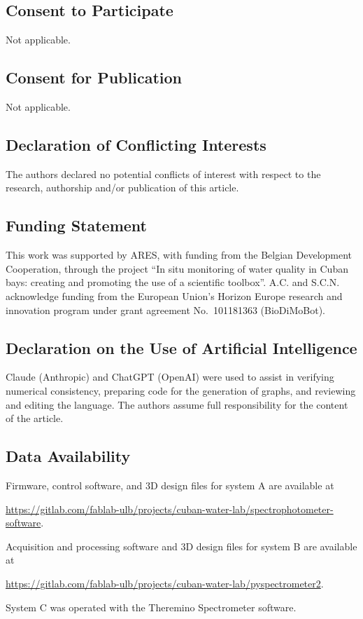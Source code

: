 \subsection*{Consent to Participate}
Not applicable.

\subsection*{Consent for Publication}
Not applicable.

\subsection*{Declaration of Conflicting Interests}
The authors declared no potential conflicts of interest with respect to the research, authorship and/or publication of this article.

\subsection*{Funding Statement}
This work was supported by ARES, with funding from the Belgian Development Cooperation, through the project ``In situ monitoring of water quality in Cuban bays: creating and promoting the use of a scientific toolbox''. A.C. and S.C.N. acknowledge funding from the European Union's Horizon Europe research and innovation program under grant agreement No.~101181363 (BioDiMoBot).

\subsection*{Declaration on the Use of Artificial Intelligence}
Claude (Anthropic) and ChatGPT (OpenAI) were used to assist in verifying numerical consistency, preparing code for the generation of graphs, and reviewing and editing the language. The authors assume full responsibility for the content of the article.

\subsection*{Data Availability}
Firmware, control software, and 3D design files for system A are available at
\begin{flushleft}
\url{https://gitlab.com/fablab-ulb/projects/cuban-water-lab/spectrophotometer-software}.
\end{flushleft}
Acquisition and processing software and 3D design files for system B are available at
\begin{flushleft}
\url{https://gitlab.com/fablab-ulb/projects/cuban-water-lab/pyspectrometer2}.
\end{flushleft}
System C was operated with the Theremino Spectrometer software.\citep{thereminoSpectrometer}
